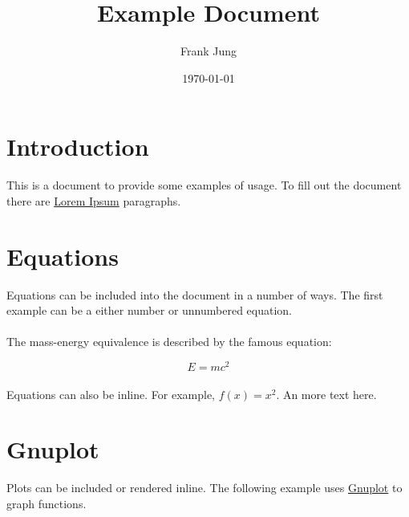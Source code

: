 \documentclass[10pt,a4paper]{article}
\title{\LaTeXe{} Example Document}
\author{Frank Jung}
\date{\today}
\begin{document}
\maketitle
\newpage

\tableofcontents{}
\listoffigures
\listoftables
\newpage

\newpage

\newcommand{\sectionbreak}{\clearpage}

\section*{Introduction}

This is a \LaTeXe{} document to provide some examples of usage. To fill out the
document there are \href{http://www.lipsum.com/}{Lorem Ipsum} paragraphs.

\lipsum[1]

\sectionbreak{}

\section*{Equations}

Equations can be included into the document in a number of ways. The first
example can be a either number or unnumbered equation.

\paragraph{}
The mass-energy equivalence is described by the famous equation:

\begin{equation}
  E = mc^2
\end{equation}

\paragraph{}
Equations can also be inline. For example, $f(x) = x^2$. An more text here.
\lipsum[2]

\sectionbreak{}

\section*{Gnuplot}

Plots can be included or rendered inline. The following example uses
\href{http://www.gnuplot.info/}{Gnuplot} to graph functions.
\end{document}
